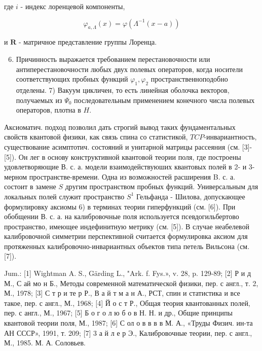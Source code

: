 \documentclass[10pt]{article}
\begin{document}
где $i$ - индекс лоренцевой компоненты,



\[

\varphi_{a, \Lambda}(x)=\varphi\left(\Lambda^{-1}(x-a)\right)

\]



и $\boldsymbol{R}$ - матричное представление группы Лоренца.



\begin{enumerate}

  \setcounter{enumi}{5}

  \item Причинность выражается требованием перестановочности или антиперестановочности любых двух полевых операторов, когда носители соответствующих пробных функций $\varphi_{1}, \varphi_{2}$ пространственноподобно отделены. 7) Вакуум цикличен, то есть линейная оболочка векторов, получаемых из $\Psi_{0}$ последовательным применением конечного числа полевых операторов, плотна в $H$.

\end{enumerate}



Аксиоматич. подход позволил дать строгий вывод таких фундаментальных свойств квантовой физики, как связь спина со статистикой, $T C P$-инвариантность, существование асимптотич. состояний и унитарной матрицы рассеяния (см. [3]-[5]). Он лег в основу конструктивной квантовой теории поля, где построены удовлетворяющие В. с. а. модели взаимодействуюших квантовых полей в 2- и 3-мерном пространстве-времени. Одна из возможностей расширения B. с. а. состоит в замене $S$ другим пространством пробных функций. Универсальным для локальных полей служит пространство $S^{1}$ Гельфанда - Шилова, допускающее формулировку аксиомы 6) в терминах теории гиперфункций (см. [6]). При обобщении В. с. а. на калибровочные поля используется псевдогильбертово пространство, имеющее индефинитную метрику (см. [5]). В случае неабелевой калибровочной симметрии перспективной считается формулировка аксиом для протяженных калибровочно-инвариантных объектов типа петель Вильсона (см. [7]).



Jum.: [1] Wightman A. S., Gärding L., "Ark. f. Fys.», v. 28, p. 129-89; [2] Р и д М., С ай мо н Б., Методы современной математической физики, пер. с англ., т. 2, М., 1978; [3] С т р и те р Р., В а й т м а н А., РСТ, спин и статистика и все такое, пер. с англ., М., 1968; [4] Й о с т Р., Общая теория квантованных полей, пер. с англ., М., 1967; [5] Б о г о л ю б о в Н. Н. и др., Общие принципы квантовой теории поля, М., 1987; [6] С ол о в в в в М. А., «Труды Физич. ин-та АН СССР», 1991, т. 209; [7] 3 а й л е р Э., Калибровочные теории, пер. с англ., М., 1985. М. А. Соловьев.
\end{document}
